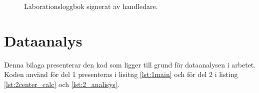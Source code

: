 \begin{figure}[H]
\begin{subfigure}{.5\textwidth}
    \end{subfigure}
    \caption{Laborationsloggbok signerat av handledare.}
    \label{bil:loggbok}
\end{figure}

\section{Dataanalys}\label{bil:kod}
Denna bilaga presenterar den kod som ligger till grund för dataanalysen i arbetet. Koden använd för del 1 presenteras i lisitng \ref{lst:1main} och för del 2 i listing \ref{lst:2center_calc} och \ref{lst:2_analisys}.



